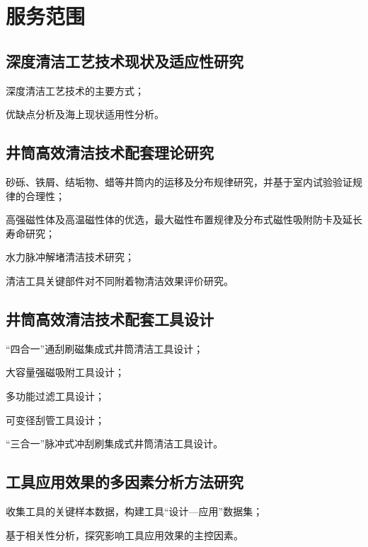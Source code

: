 \section{服务范围}
\subsection{深度清洁工艺技术现状及适应性研究}
\begin{circlist}
\item 深度清洁工艺技术的主要方式；
\item 优缺点分析及海上现状适用性分析。
\end{circlist}

\subsection{井筒高效清洁技术配套理论研究}
\begin{circlist}
\item 砂砾、铁屑、结垢物、蜡等井筒内的运移及分布规律研究，并基于室内试验验证规律的合理性；
\item 高强磁性体及高温磁性体的优选，最大磁性布置规律及分布式磁性吸附防卡及延长寿命研究；
\item 水力脉冲解堵清洁技术研究；
\item 清洁工具关键部件对不同附着物清洁效果评价研究。
\end{circlist}

\subsection{井筒高效清洁技术配套工具设计}
\begin{circlist}
\item “四合一”通刮刷磁集成式井筒清洁工具设计；
\item 大容量强磁吸附工具设计；
\item 多功能过滤工具设计；
\item 可变径刮管工具设计；
\item “三合一”脉冲式冲刮刷集成式井筒清洁工具设计。
\end{circlist}

\subsection{工具应用效果的多因素分析方法研究}
\begin{circlist}
\item 收集工具的关键样本数据，构建工具“设计—应用”数据集；
\item 基于相关性分析，探究影响工具应用效果的主控因素。
\end{circlist}


